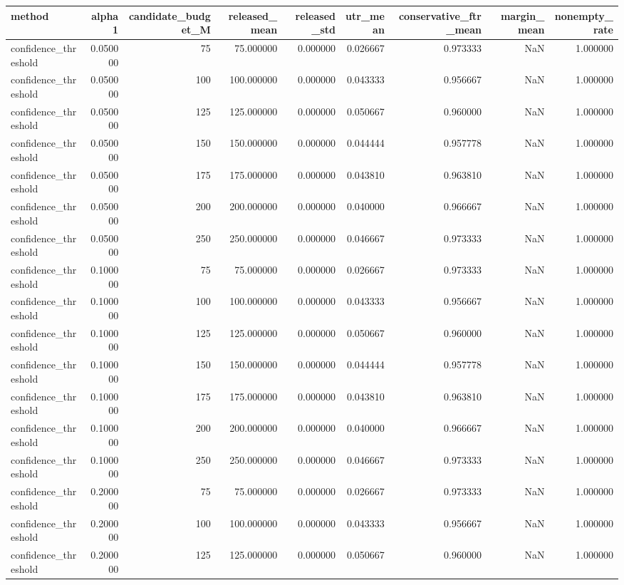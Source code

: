 \begin{tabular}{lrrrrrrrr}
\toprule
method & alpha1 & candidate_budget_M & released_mean & released_std & utr_mean & conservative_ftr_mean & margin_mean & nonempty_rate \\
\midrule
confidence_threshold & 0.050000 & 75 & 75.000000 & 0.000000 & 0.026667 & 0.973333 & NaN & 1.000000 \\
confidence_threshold & 0.050000 & 100 & 100.000000 & 0.000000 & 0.043333 & 0.956667 & NaN & 1.000000 \\
confidence_threshold & 0.050000 & 125 & 125.000000 & 0.000000 & 0.050667 & 0.960000 & NaN & 1.000000 \\
confidence_threshold & 0.050000 & 150 & 150.000000 & 0.000000 & 0.044444 & 0.957778 & NaN & 1.000000 \\
confidence_threshold & 0.050000 & 175 & 175.000000 & 0.000000 & 0.043810 & 0.963810 & NaN & 1.000000 \\
confidence_threshold & 0.050000 & 200 & 200.000000 & 0.000000 & 0.040000 & 0.966667 & NaN & 1.000000 \\
confidence_threshold & 0.050000 & 250 & 250.000000 & 0.000000 & 0.046667 & 0.973333 & NaN & 1.000000 \\
confidence_threshold & 0.100000 & 75 & 75.000000 & 0.000000 & 0.026667 & 0.973333 & NaN & 1.000000 \\
confidence_threshold & 0.100000 & 100 & 100.000000 & 0.000000 & 0.043333 & 0.956667 & NaN & 1.000000 \\
confidence_threshold & 0.100000 & 125 & 125.000000 & 0.000000 & 0.050667 & 0.960000 & NaN & 1.000000 \\
confidence_threshold & 0.100000 & 150 & 150.000000 & 0.000000 & 0.044444 & 0.957778 & NaN & 1.000000 \\
confidence_threshold & 0.100000 & 175 & 175.000000 & 0.000000 & 0.043810 & 0.963810 & NaN & 1.000000 \\
confidence_threshold & 0.100000 & 200 & 200.000000 & 0.000000 & 0.040000 & 0.966667 & NaN & 1.000000 \\
confidence_threshold & 0.100000 & 250 & 250.000000 & 0.000000 & 0.046667 & 0.973333 & NaN & 1.000000 \\
confidence_threshold & 0.200000 & 75 & 75.000000 & 0.000000 & 0.026667 & 0.973333 & NaN & 1.000000 \\
confidence_threshold & 0.200000 & 100 & 100.000000 & 0.000000 & 0.043333 & 0.956667 & NaN & 1.000000 \\
confidence_threshold & 0.200000 & 125 & 125.000000 & 0.000000 & 0.050667 & 0.960000 & NaN & 1.000000 \\

\end{tabular}
